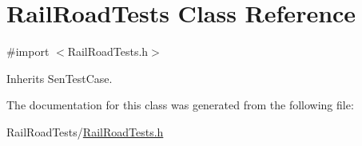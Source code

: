 \hypertarget{interface_rail_road_tests}{\section{Rail\-Road\-Tests Class Reference}
\label{interface_rail_road_tests}
}


{\ttfamily \#import $<$Rail\-Road\-Tests.\-h$>$}



Inherits Sen\-Test\-Case.



The documentation for this class was generated from the following file\-:\begin{DoxyCompactItemize}
\item 
Rail\-Road\-Tests/\hyperlink{_rail_road_tests_8h}{Rail\-Road\-Tests.\-h}\end{DoxyCompactItemize}
